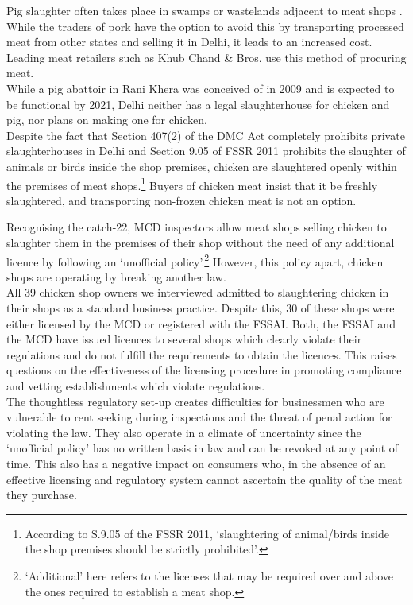 \documentclass[a4paper, 12pt]{article}
\begin{document}
Pig slaughter often takes place in swamps or wastelands adjacent to meat shops \parencite{tnnnews}. While the traders of pork have the option to avoid this by transporting processed meat from other states and selling it in Delhi, it leads to an increased cost. Leading meat retailers such as Khub Chand \& Bros. use this method of procuring meat.\\

While a pig abattoir in Rani Khera was conceived of in 2009 and is expected to be functional by 2021, Delhi neither has a legal slaughterhouse for chicken and pig, nor plans on making one for chicken. \\

Despite the fact that Section 407(2) of the DMC Act completely prohibits private slaughterhouses in Delhi and Section 9.05 of FSSR 2011 prohibits the slaughter of animals or birds inside the shop premises, chicken are slaughtered openly within the premises of meat shops.\footnote{According to S.9.05 of the FSSR 2011, ‘slaughtering of animal/birds inside the shop premises should be strictly prohibited’.} Buyers of chicken meat insist that it be freshly slaughtered, and transporting non-frozen chicken meat is not an option.

Recognising the catch-22, MCD inspectors allow meat shops selling chicken to slaughter them in the premises of their shop without the need of any additional licence by following an ‘unofficial policy’.\footnote{‘Additional’ here refers to the licenses that may be required over and above the ones required to establish a meat shop.} However, this policy apart, chicken shops are operating by breaking another law. \\

All 39 chicken shop owners we interviewed admitted to slaughtering chicken in their shops as a standard business practice. Despite this, 30 of these shops were either licensed by the MCD or registered with the FSSAI. Both, the FSSAI and the MCD have issued licences to several shops which clearly violate their regulations and do not fulfill the requirements to obtain the licences. This raises questions on the effectiveness of the licensing procedure in promoting compliance and vetting establishments which violate regulations. \\

The thoughtless regulatory set-up creates difficulties for businessmen who are vulnerable to rent seeking during inspections and the threat of penal action for violating the law. They also operate in a climate of uncertainty since the ‘unofficial policy’ has no written basis in law and can be revoked at any point of time. This also has a negative impact on consumers who, in the absence of an effective licensing and regulatory system cannot ascertain the quality of the meat they purchase. \\
\end{document}
